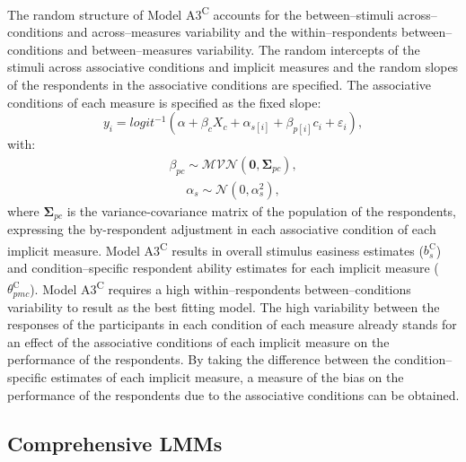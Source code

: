 \documentclass[12pt]{book}
\begin{document}
The random structure of Model A3\textsuperscript{C} accounts for the between--stimuli across--conditions and across--measures variability and the within--respondents between--conditions and between--measures variability.
The random intercepts of the stimuli across associative conditions and implicit measures and the random slopes of the respondents in the associative conditions are specified. The associative conditions of each measure is specified as the fixed slope:
%
\begin{equation}\label{eq:type2}
	y_{i} = logit^{-1}(\alpha + \beta_{c}X_{c} + \alpha_{s[i]} +  \beta_{p[i]}c_{i} + \varepsilon_{i}),
\end{equation}
with:
\begin{align}
	\beta_{pc} \sim \mathcal{MVN}(\bm{0}, \bm{\Sigma}_{pc}),
\end{align}
\begin{align}
	\alpha_s \sim \mathcal{N} (0, \alpha_s^2),
\end{align}
where $\bm{\Sigma}_{pc}$ is the variance-covariance matrix of the population of the respondents, expressing the by-respondent adjustment in each associative condition of each implicit measure.
Model A3\textsuperscript{C} results in overall stimulus easiness estimates ($b_{s}^\text{C}$) and condition--specific respondent ability estimates for each implicit measure ($\theta_{pmc}^\text{C}$). 
Model A3\textsuperscript{C} requires a high within--respondents between--conditions variability to result as the best fitting model.
The high variability between the responses of the participants in each condition of each measure already stands for an effect of the associative conditions of each implicit measure on the performance of the respondents. 
	By taking the difference between the condition--specific estimates of each implicit measure, a measure of the bias on the performance of the respondents due to the associative conditions can be obtained.

\subsection{Comprehensive LMMs}\label{sec:clmms}
\end{document}
